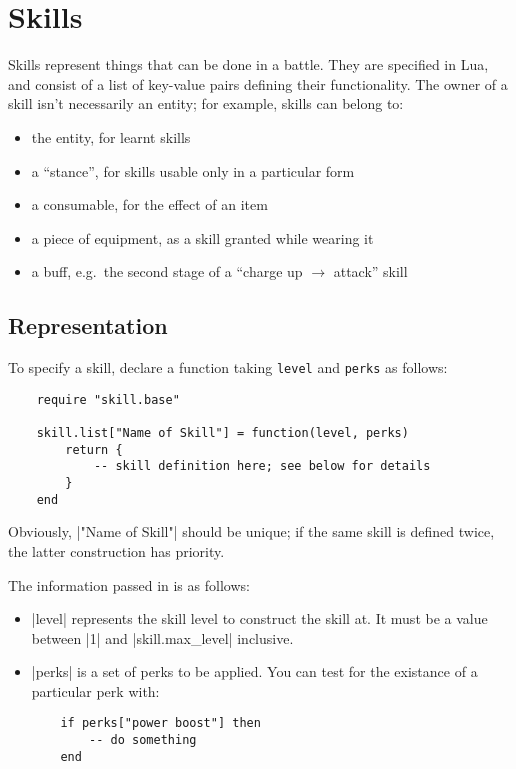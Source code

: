 \chapter{Skills}
\label{ch:skill}

Skills represent things that can be done in a battle.
They are specified in Lua, and consist of
a list of key-value pairs defining their functionality.
The owner of a skill isn't necessarily an entity;
for example, skills can belong to:
\begin{itemize}[noitemsep]
    \item the entity, for learnt skills
    \item a ``stance'', for skills usable only in a particular form
    \item a consumable, for the effect of an item
    \item a piece of equipment, as a skill granted while wearing it
    \item a buff, e.g.\ the second stage of a ``charge up $\rightarrow$ attack'' skill
\end{itemize}

\section{Representation}
\label{sec:skill_representation}

To specify a skill, declare a function
taking \texttt{level} and \texttt{perks} as follows:
\begin{lstlisting}
    require "skill.base"

    skill.list["Name of Skill"] = function(level, perks)
        return {
            -- skill definition here; see below for details
        }
    end
\end{lstlisting}

Obviously, |"Name of Skill"| should be unique;
if the same skill is defined twice, the latter construction has priority.

The information passed in is as follows:

\begin{itemize}
    \item |level| represents the skill level to construct the skill at.
        It must be a value between |1| and |skill.max_level| inclusive.

    \item |perks| is a set of perks to be applied.
        You can test for the existance of a particular perk with:
\begin{lstlisting}
    if perks["power boost"] then
        -- do something
    end
\end{lstlisting}
\end{itemize}


